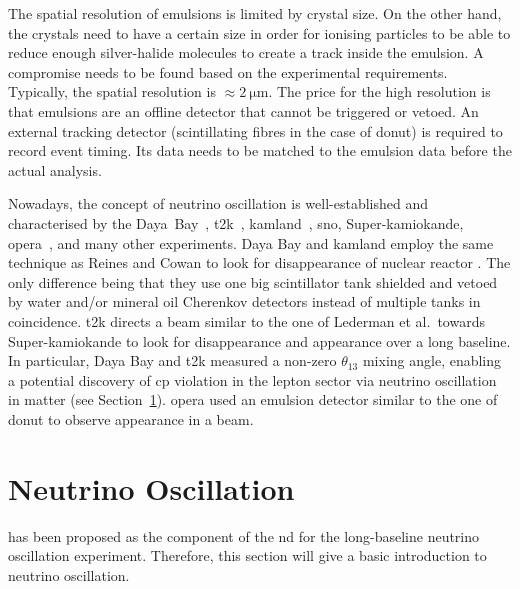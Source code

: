 The spatial resolution of emulsions is limited by crystal size.
On the other hand, the crystals need to have a certain size in order for ionising particles to be able to reduce enough silver-halide molecules to create a track inside the emulsion.
A compromise needs to be found based on the experimental requirements.
Typically, the spatial resolution is $\approx \SI{2}{\micro\metre}$.
The price for the high resolution is that emulsions are an offline detector that cannot be triggered or vetoed.
An external tracking detector (scintillating fibres in the case of \gls{donut}) is required to record event timing.
Its data needs to be matched to the emulsion data before the actual analysis.

Nowadays, the concept of neutrino oscillation is well-established and characterised by the Daya~Bay~\cite{dayabayRecent}, \gls{t2k}~\cite{t2kOsc}, \gls{kamland}~\cite{kamland}, \gls{sno}, Super-\gls{kamiokande}, \gls{opera}~\cite{opera}, and many other experiments.
Daya Bay and \gls{kamland} employ the same technique as Reines and Cowan to look for disappearance of nuclear reactor \Pagne.
The only difference being that they use one big scintillator tank shielded and vetoed by water and/or mineral oil Cherenkov detectors instead of multiple tanks in coincidence.
\gls{t2k} directs a \Pgngm beam similar to the one of Lederman et al.\ towards Super-\gls{kamiokande} to look for \Pgngm disappearance and \Pgne appearance over a long baseline.
In particular, Daya Bay and \gls{t2k} measured a non-zero $\theta_{13}$ mixing angle, enabling a potential discovery of \gls{cp} violation in the lepton sector via neutrino oscillation in matter (see Section~\ref{sec:nu-detection_osc}).
\gls{opera} used an emulsion detector similar to the one of \gls{donut} to observe \Pgngt appearance in a \Pgngm beam.


\section{Neutrino Oscillation}
\label{sec:nu-detection_osc}

\AC{} has been proposed as the \lar{} component of the \gls{nd} for the \dune{} long-baseline neutrino oscillation experiment.
Therefore, this section will give a basic introduction to neutrino oscillation.

